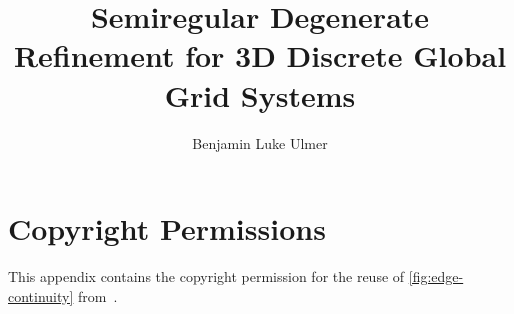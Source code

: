 \documentclass[12pt]{ucalgthes1}
\title{Semiregular Degenerate Refinement for 3D Discrete Global Grid Systems}
\author{Benjamin Luke Ulmer}
\begin{document}














\appendix




\chapter{Copyright Permissions}
This appendix contains the copyright permission for the reuse of \cref{fig:edge-continuity} from~\cite{hennerdal2015beyond}.

\end{document}
